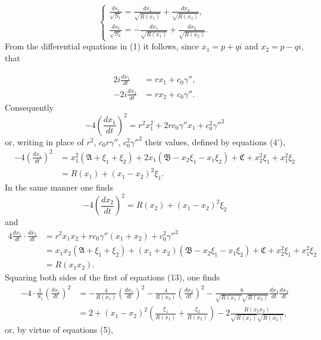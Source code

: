\documentclass{article}
\begin{document}
\begin{equation}
\begin{cases}
\displaystyle \frac{ds_1}{\sqrt{S_1}} = \frac{dx_1}{\sqrt{R(x_1)}} + \frac{dx_2}{\sqrt{R(x_2)}}, \\[2ex]
\displaystyle \frac{ds_2}{\sqrt{S_2}} = -\frac{dx_1}{\sqrt{R(x_1)}} + \frac{dx_2}{\sqrt{R(x_2)}}.
\end{cases}
\end{equation}
From the differential equations in (1) it follows, since $x_1 = p + qi$ and $x_2 = p - qi$, that

\begin{equation}
\begin{aligned}
2i\frac{dx_1}{dt} &= rx_1 + c_0\gamma'', \\
-2i\frac{dx_2}{dt} &= rx_2 + c_0\gamma''.
\end{aligned}
\end{equation}
Consequently
\[
-4\left(\frac{dx_1}{dt}\right)^2 = r^2x_1^2 + 2rc_0\gamma''x_1 + c_0^2\gamma''^2
\]
or, writing in place of $r^2$, $c_0r\gamma''$, $c_0^2\gamma''^2$ their values, defined by equations (4'),
\begin{align*}
-4\left(\frac{dx_1}{dt}\right)^2 &= x_1^2(\mathfrak{A} + \xi_1 + \xi_2) + 2x_1(\mathfrak{B} - x_2\xi_1 - x_1\xi_2) + \mathfrak{C} + x_2^2\xi_1 + x_1^2\xi_2 \\
&= R(x_1) + (x_1 - x_2)^2\xi_1.
\end{align*}
In the same manner one finds
\[
-4\left(\frac{dx_2}{dt}\right)^2 = R(x_2) + (x_1 - x_2)^2\xi_2
\]
and
\begin{align*}
4\frac{dx_1}{dt}\cdot\frac{dx_2}{dt} &= r^2x_1x_2 + rc_0\gamma''(x_1 + x_2) + c_0^2\gamma''^2 \\
&= x_1x_2(\mathfrak{A} + \xi_1 + \xi_2) + (x_1 + x_2)(\mathfrak{B} - x_2\xi_1 - x_1\xi_2) + \mathfrak{C} + x_2^2\xi_1 + x_1^2\xi_2 \\
&= R(x_1x_2).
\end{align*}
Squaring both sides of the first of equations (13), one finds
\begin{align*}
-4\cdot\frac{1}{S_1}\left(\frac{ds_1}{dt}\right)^2 &= -\frac{4}{R(x_1)}\left(\frac{dx_1}{dt}\right)^2 - \frac{4}{R(x_2)}\left(\frac{dx_2}{dt}\right)^2 - \frac{8}{\sqrt{R(x_1)}\sqrt{R(x_2)}}\frac{dx_1}{dt}\frac{dx_2}{dt} \\
&= 2 + (x_1 - x_2)^2\left(\frac{\xi_1}{R(x_1)} + \frac{\xi_2}{R(x_2)}\right) - 2\frac{R(x_1x_2)}{\sqrt{R(x_1)}\sqrt{R(x_2)}},
\end{align*}
or, by virtue of equations (5),
\end{document}
